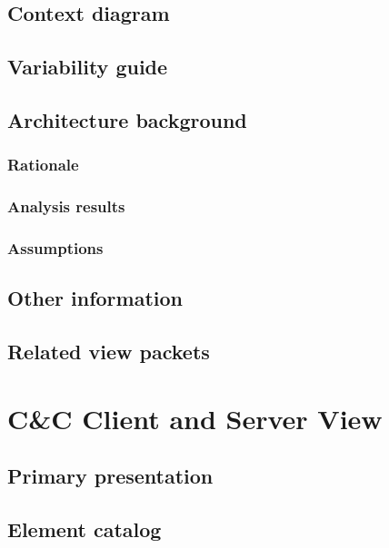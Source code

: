 \documentclass[a4paper,10pt]{report}
\begin{document}
\subsection{Context diagram}

\subsection{Variability guide}

\subsection{Architecture background}

\subsubsection{Rationale}

\subsubsection{Analysis results}

\subsubsection{Assumptions}

\subsection{Other information}

\subsection{Related view packets}




\section{C\&C Client and Server View}

\subsection{Primary presentation}

\subsection{Element catalog}
\end{document}
